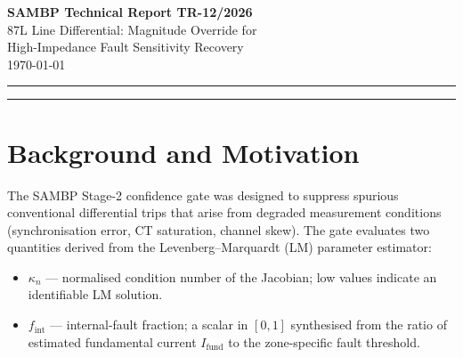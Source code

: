 \documentclass[11pt,a4paper]{article}
\newcommand{\Ifund}{I_{\mathrm{fund}}}
\newcommand{\fint}{f_{\mathrm{int}}}
\newcommand{\alphafifty}{\alpha_{50}}
\newcommand{\kappan}{\kappa_n}
\begin{document}

\begin{center}
  {\LARGE\bfseries SAMBP Technical Report TR-12/2026}\\[6pt]
  {\large 87L Line Differential: Magnitude Override for\\
          High-Impedance Fault Sensitivity Recovery}\\[4pt]
  \today
\end{center}

\vspace{4pt}
\noindent\rule{\linewidth}{0.6pt}

\begin{abstract}
SAMBP TR-11 identified a sensitivity penalty in the 87L line differential
relay under high-impedance fault (HIF) conditions: the Stage-2 model veto
suppressed correct conventional trips when the fault current fell below
$\alpha \approx 0.15$ (ag) or $0.07$ (3ph) of nominal, because low fault current
reduces the LM-estimated fundamental $\Ifund$ below the $\fint$ trip
threshold.  This report extends the magnitude-override mechanism introduced
for the bus differential gate in TR-10 to the 87L confidence gate.  A
threshold of $\Ifund \geq 0.30$~pu is used to bypass the Stage-2 veto when
the conventional relay has already picked up.  Post-fix validation with
$N=200$ trials per scenario shows the 87L $\alphafifty$ improving from
$0.15\to0.10$ (ag) and $0.07\to0.05$ (3ph).  All bus and transformer zones
retain TPR\,=\,1.000 across all $\alpha \in [0.05, 1.00]$, confirming no
regression.
\end{abstract}

\noindent\rule{\linewidth}{0.6pt}

\tableofcontents
\vspace{6pt}

\section{Background and Motivation}
\label{sec:background}

The SAMBP Stage-2 confidence gate was designed to suppress spurious
conventional differential trips that arise from degraded measurement
conditions (synchronisation error, CT saturation, channel skew).  The gate
evaluates two quantities derived from the Levenberg--Marquardt (LM) parameter
estimator:
\begin{itemize}
  \item $\kappan$ — normalised condition number of the Jacobian; low values
        indicate an identifiable LM solution.
  \item $\fint$ — internal-fault fraction; a scalar in $[0,1]$ synthesised
        from the ratio of estimated fundamental current $\Ifund$ to the
        zone-specific fault threshold.
\end{itemize}
\end{document}
